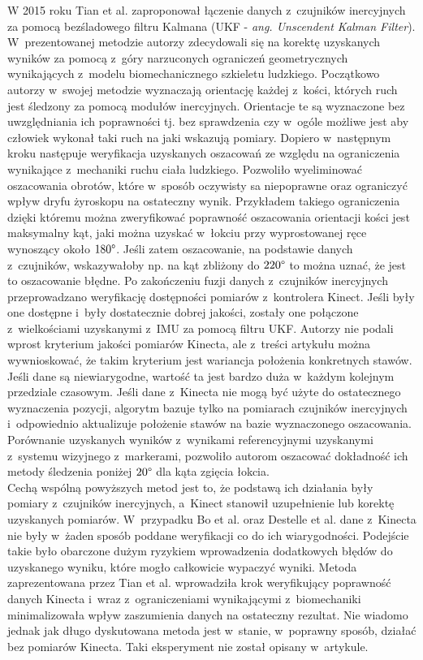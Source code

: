 W 2015 roku Tian et al. \cite{Tian2015a} zaproponował łączenie danych z~czujników inercyjnych za pomocą bezśladowego filtru Kalmana (UKF - \emph{ang. Unscendent Kalman Filter}). W~prezentowanej metodzie autorzy zdecydowali się na korektę uzyskanych wyników za pomocą z~góry narzuconych ograniczeń geometrycznych wynikających z~modelu biomechanicznego szkieletu ludzkiego. Początkowo autorzy w~swojej metodzie wyznaczają orientację każdej z~kości, których ruch jest śledzony za pomocą modułów inercyjnych. Orientacje te są wyznaczone bez uwzględniania ich poprawności tj. bez sprawdzenia czy w~ogóle możliwe jest aby człowiek wykonał taki ruch na jaki wskazują pomiary. Dopiero w~następnym kroku następuje weryfikacja uzyskanych oszacowań ze względu na ograniczenia wynikające z~mechaniki ruchu ciała ludzkiego. Pozwoliło wyeliminować oszacowania obrotów, które w~sposób oczywisty sa niepoprawne oraz ograniczyć wpływ dryfu żyroskopu na ostateczny wynik. Przykładem takiego ograniczenia dzięki któremu można zweryfikować poprawność oszacowania orientacji kości jest maksymalny kąt, jaki można uzyskać w~łokciu przy wyprostowanej ręce wynoszący około $180\degree$. Jeśli zatem oszacowanie, na podstawie danych z~czujników, wskazywałoby np. na kąt zbliżony do $220\degree$ to można uznać, że jest to oszacowanie błędne. Po zakończeniu fuzji danych z~czujników inercyjnych przeprowadzano weryfikację dostępności pomiarów z~kontrolera Kinect. Jeśli były one dostępne i~były dostatecznie dobrej jakości, zostały one połączone z~wielkościami uzyskanymi z~IMU za pomocą filtru UKF. Autorzy nie podali wprost kryterium jakości pomiarów Kinecta, ale z~treści artykułu można wywnioskować, że takim kryterium jest wariancja położenia konkretnych stawów. Jeśli dane są niewiarygodne, wartość ta jest bardzo duża w~każdym kolejnym przedziale czasowym. Jeśli dane z~Kinecta nie mogą być użyte do ostatecznego wyznaczenia pozycji, algorytm bazuje tylko na pomiarach czujników inercyjnych i~odpowiednio aktualizuje położenie stawów na bazie wyznaczonego oszacowania. Porównanie uzyskanych wyników z~wynikami referencyjnymi uzyskanymi z~systemu wizyjnego z~markerami, pozwoliło autorom oszacować dokładność ich metody śledzenia poniżej $20\degree$ dla kąta zgięcia łokcia.\\
																																																	
Cechą wspólną powyższych metod jest to, że podstawą ich działania były pomiary z~czujników inercyjnych, a~Kinect stanowił uzupełnienie lub korektę uzyskanych pomiarów. W~przypadku Bo et al. oraz Destelle et al. dane z~Kinecta nie były w~żaden sposób poddane weryfikacji co do ich wiarygodności. Podejście takie było obarczone dużym ryzykiem wprowadzenia dodatkowych błędów do uzyskanego wyniku, które mogło całkowicie wypaczyć wyniki. Metoda zaprezentowana przez Tian et al. wprowadziła krok weryfikujący poprawność danych Kinecta i~wraz z~ograniczeniami wynikającymi z~biomechaniki minimalizowała wpływ zaszumienia danych na ostateczny rezultat. Nie wiadomo jednak jak długo dyskutowana metoda jest w~stanie, w~poprawny sposób, działać bez pomiarów Kinecta. Taki eksperyment nie został opisany w~artykule.\\\\
																																																	
